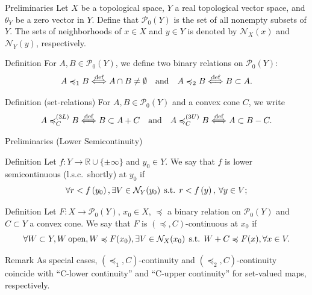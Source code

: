\documentclass[aspectratio=169, dvipdfmx, 11pt]{beamer}
\newcommand{\RealNumberSet}{\mathbb{R}}
\newcommand{\Nbd}[2]{\mbox{$\mathcal{N}_{#1}({#2})$}}
\newcommand{\pow}[1]{\mathcal{P}_{0}(#1)}
\newcommand{\SuchThat}{\:\text{s.t.}\:}
\begin{document}
\begin{frame}{Preliminaries}
  Let $X$ be a topological space, $Y$ a real topological vector space, and $\theta_Y$ be a zero vector in $Y$.
  Define that $\pow{Y}$ is the set of all nonempty subsets of $Y$.
  The sets of neighborhoods of $x \in X$ and $y \in Y$ is denoted by $\mathcal{N}_X (x)$ and $\mathcal{N}_Y (y)$, respectively.

  \begin{block}{Definition}
    For $A,B \in \pow{Y}$, we define two binary relations on $\pow{Y}$:
    \begin{equation}
      A \preccurlyeq_1 B \overset{\text{def}}{\Longleftrightarrow} A \cap B \ne \emptyset \quad \text{and} \quad A \preccurlyeq_2 B \overset{\text{def}}{\Longleftrightarrow} B \subset A. \notag
    \end{equation}
  \end{block}

  \begin{block}{Definition (set-relations) \cite{kuroiwa1997cone}}
    For $A,B \in \pow{Y}$ and a convex cone $C$, we write
    \begin{equation}
      A \preccurlyeq_{C}^{(3L)} B \overset{\text{def}}{\Longleftrightarrow} B \subset A + C
      \quad \text{and} \quad A \preccurlyeq_{C}^{(3U)} B \overset{\text{def}}{\Longleftrightarrow} A \subset B -C. \notag
    \end{equation}
  \end{block}
\end{frame}

\begin{frame}{Preliminaries (Lower Semicontinuity)}
  \begin{block}{Definition}
    Let $f:Y\rightarrow \RealNumberSet \cup \{ \pm \infty\}$ and $y_{0}\in{Y}$.
    We say that $f$ is
    lower semicontinuous (l.s.c.\ shortly) at $y_{0}$ if
    \begin{equation}
      \forall r < f \left( y_{0} \right),
      \exists V \in \Nbd{Y}{y_{0}} \:\SuchThat\: r < f \left( y \right),\: \forall y \in V; \notag
    \end{equation}
  \end{block}

  \begin{block}{Definition \cite{500001551932}}
    Let $F \colon X \to \pow{Y}$, $x_0 \in X$, $\preccurlyeq$ a binary relation on $\pow{Y}$
    and $C \subset Y$ a convex cone. We say that $F$ is $(\preccurlyeq, C)$-continuous at $x_0$ if
    \begin{equation}
      \forall W \subset Y, W\:\text{open},W \preccurlyeq F(x_0), \exists V \in \mathcal{N}_{X}(x_0) \:\SuchThat\: W + C \preccurlyeq F(x), \forall x \in V. \notag
    \end{equation}
  \end{block}

  \begin{alertblock}{Remark}
    As special cases, $(\preccurlyeq_1, C)$-continuity and $(\preccurlyeq_2, C)$-continuity coincide with “C-lower
    continuity” and “C-upper continuity” for set-valued maps, respectively.
  \end{alertblock}
\end{frame}
\end{document}
